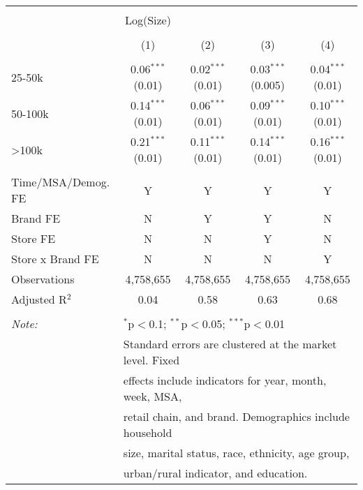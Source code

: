 
\begin{table}[!htbp] \centering 
  \caption{} 
  \label{tab:packageSizeFull7003} 
\begin{tabular}{@{\extracolsep{5pt}}lcccc} 
\\[-1.8ex]\hline 
\hline \\[-1.8ex] 
 & Log(Size) &  &  &  \\ 
\\[-1.8ex] & (1) & (2) & (3) & (4)\\ 
\hline \\[-1.8ex] 
 25-50k & 0.06$^{***}$ (0.01) & 0.02$^{***}$ (0.01) & 0.03$^{***}$ (0.005) & 0.04$^{***}$ (0.01) \\ 
  50-100k & 0.14$^{***}$ (0.01) & 0.06$^{***}$ (0.01) & 0.09$^{***}$ (0.01) & 0.10$^{***}$ (0.01) \\ 
  >100k & 0.21$^{***}$ (0.01) & 0.11$^{***}$ (0.01) & 0.14$^{***}$ (0.01) & 0.16$^{***}$ (0.01) \\ 
 \hline \\[-1.8ex] 
Time/MSA/Demog. FE & Y & Y & Y & Y \\ 
Brand FE & N & Y & Y & N \\ 
Store FE & N & N & Y & N \\ 
Store x Brand FE & N & N & N & Y \\ 
Observations & 4,758,655 & 4,758,655 & 4,758,655 & 4,758,655 \\ 
Adjusted R$^{2}$ & 0.04 & 0.58 & 0.63 & 0.68 \\ 
\hline 
\hline \\[-1.8ex] 
\textit{Note:}  & \multicolumn{4}{l}{$^{*}$p$<$0.1; $^{**}$p$<$0.05; $^{***}$p$<$0.01} \\ 
 & \multicolumn{4}{l}{Standard errors are clustered at the market level. Fixed } \\ 
 & \multicolumn{4}{l}{effects include indicators for year, month, week, MSA, } \\ 
 & \multicolumn{4}{l}{retail chain, and brand. Demographics include household } \\ 
 & \multicolumn{4}{l}{size, marital status, race, ethnicity, age group, } \\ 
 & \multicolumn{4}{l}{urban/rural indicator, and education.} \\ 
\end{tabular} 
\end{table} 
